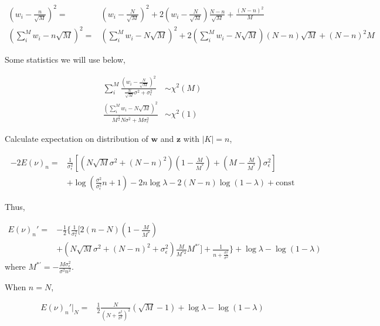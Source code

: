 \begin{equation}
\begin{aligned}
    (w_i-\frac{n}{\sqrt{M}})^2 =& (w_i - \frac{N}{\sqrt{M}})^2 + 2(w_i - \frac{N}{\sqrt{M}})\frac{N-n}{\sqrt{M}} + \frac{(N-n)^2}{M} \\
    (\sum_i^M w_i-n\sqrt{M})^2 =& (\sum_i^M w_i-N\sqrt{M})^2 + 2(\sum_i^M w_i-N\sqrt{M})(N-n)\sqrt{M} + (N-n)^2M
\end{aligned}
\end{equation}

Some statistics we will use below,

\begin{equation}
\begin{aligned}
    \sum_i^M\frac{(w_i - \frac{N}{\sqrt{M}})^2}{\frac{N}{\sqrt{M}}\sigma^2+\sigma_\epsilon^2} &\sim \chi^2(M) \\
    \frac{(\sum_i^M w_i-N\sqrt{M})^2}{M^{\frac{3}{2}}N\sigma^2+M\sigma_\epsilon^2} &\sim \chi^2(1)
\end{aligned}
\end{equation}

Calculate expectation on distribution of $\bm{w}$ and $\bm{z}$ with $|K|=n$, 

\begin{equation}
\begin{aligned}
    -2E(\nu)_n =& \frac{1}{\sigma_\epsilon^2}[(N\sqrt{M}\sigma^2+(N-n)^2)(1-\frac{M}{M^\ast})+(M-\frac{M}{M^\ast})\sigma_\epsilon^2] \\
    &+ \log(\frac{\sigma^2}{\sigma_\epsilon^2}n+1) - 2n\log\lambda - 2(N-n)\log(1-\lambda) + \mathrm{const}
\end{aligned}
\end{equation}

Thus, 

\begin{equation}
\begin{aligned}
    E(\nu)_n' =& -\frac{1}{2}\{\frac{1}{\sigma_\epsilon^2}[2(n-N)(1-\frac{M}{M^\ast}) \\
    &+(N\sqrt{M}\sigma^2+(N-n)^2+\sigma_\epsilon^2)\frac{M}{M^{\ast2}}M^{\ast'}] +\frac{1}{n+\frac{\sigma_\epsilon^2}{\sigma^2}}\} + \log\lambda - \log(1-\lambda)
\end{aligned}
\end{equation}
where $M^{\ast'}=-\frac{M\sigma_\epsilon^2}{\sigma^2n^2}$. 

When $n=N$,

\begin{equation}
\begin{aligned}
    E(\nu)_n'|_N =& \frac{1}{2}\frac{N}{(N+\frac{\sigma_\epsilon^2}{\sigma^2})^2}(\sqrt{M}-1) + \log\lambda - \log(1-\lambda)
\end{aligned}
\end{equation}


